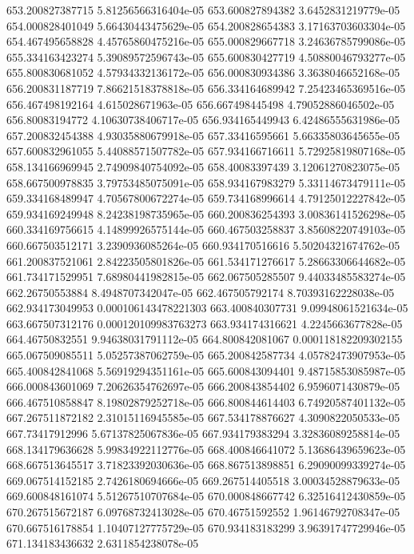 {653.200827387715 5.81256566316404e-05
653.600827894382 3.6452831219779e-05
654.000828401049 5.66430443475629e-05
654.200828654383 3.17163703603304e-05
654.467495658828 4.45765860475216e-05
655.000829667718 3.24636785799086e-05
655.334163423274 5.39089572596743e-05
655.600830427719 4.50880046793277e-05
655.800830681052 4.57934332136172e-05
656.000830934386 3.3638046652168e-05
656.200831187719 7.86621518378818e-05
656.334164689942 7.25423465369516e-05
656.467498192164 4.615028671963e-05
656.667498445498 4.79052886046502e-05
656.80083194772 4.10630738406717e-05
656.934165449943 6.42486555631986e-05
657.200832454388 4.93035880679918e-05
657.33416595661 5.66335803645655e-05
657.600832961055 5.44088571507782e-05
657.934166716611 5.72925819807168e-05
658.134166969945 2.74909840754092e-05
658.40083397439 3.12061270823075e-05
658.667500978835 3.79753485075091e-05
658.934167983279 5.33114673479111e-05
659.334168489947 4.70567800672274e-05
659.734168996614 4.79125012227842e-05
659.934169249948 8.24238198735965e-05
660.200836254393 3.00836141526298e-05
660.334169756615 4.14899926575144e-05
660.467503258837 3.85608220749103e-05
660.667503512171 3.2390936085264e-05
660.934170516616 5.50204321674762e-05
661.200837521061 2.84223505801826e-05
661.534171276617 5.28663306644682e-05
661.734171529951 7.68980441982815e-05
662.067505285507 9.44033485583274e-05
662.26750553884 8.4948707342047e-05
662.467505792174 8.70393162228038e-05
662.934173049953 0.000106143478221303
663.400840307731 9.09948061521634e-05
663.667507312176 0.000120109983763273
663.934174316621 4.2245663677828e-05
664.46750832551 9.94638031791112e-05
664.800842081067 0.000118182209302155
665.067509085511 5.05257387062759e-05
665.200842587734 4.05782473907953e-05
665.400842841068 5.56919294351161e-05
665.600843094401 9.48715853085987e-05
666.000843601069 7.20626354762697e-05
666.200843854402 6.9596071430879e-05
666.467510858847 8.19802879252718e-05
666.800844614403 6.74920587401132e-05
667.267511872182 2.31015116945585e-05
667.534178876627 4.3090822050533e-05
667.73417912996 5.67137825067836e-05
667.934179383294 3.32836089258814e-05
668.134179636628 5.99834922112776e-05
668.400846641072 5.13686439659623e-05
668.667513645517 3.71823392030636e-05
668.867513898851 6.29090099339274e-05
669.067514152185 2.7426180694666e-05
669.267514405518 3.00034528879633e-05
669.600848161074 5.51267510707684e-05
670.000848667742 6.32516412430859e-05
670.267515672187 6.09768732413028e-05
670.46751592552 1.96146792708347e-05
670.667516178854 1.10407127775729e-05
670.934183183299 3.96391747729946e-05
671.134183436632 2.6311854238078e-05
}
